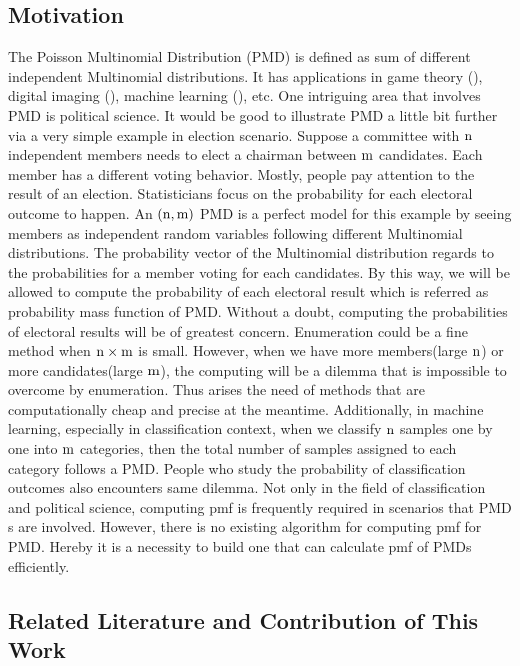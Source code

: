 \documentclass[12pt]{article}
\newcommand{\PMD}{\textrm{PMD}}
\begin{document}
\subsection{Motivation}

The Poisson Multinomial Distribution ($\PMD$) is defined as sum of different independent Multinomial distributions. It has applications in game theory (), digital imaging (), machine learning (), etc. One intriguing area that involves $\PMD$ is political science. It would be good to illustrate $\PMD$ a little bit further via a very simple example in election scenario. Suppose a committee with $\rm n$  independent members needs to elect a chairman between $\rm m$ candidates. Each member has a different voting behavior. Mostly, people pay attention to the result of an election. Statisticians focus on the probability for each electoral outcome to happen. An $\rm (n,m)$ $\PMD$ is a perfect model for this example by seeing members as independent random variables following different Multinomial distributions. The probability vector of the Multinomial distribution regards to the probabilities for a member voting for each candidates. By this way, we will be allowed to compute the probability of each electoral result which is referred as probability mass function of $\PMD$. Without a doubt, computing the probabilities of electoral results will be of greatest concern. Enumeration could be a fine method when $\rm n \times m$ is small. However, when we have more members(large $\rm n$) or more candidates(large $\rm m$), the computing will be a dilemma that is impossible to overcome by enumeration. Thus arises the need of methods that are computationally cheap and precise at the meantime. Additionally, in machine learning, especially in classification context, when we classify $\rm n$ samples one by one into $\rm m$ categories, then the total number of samples assigned to each category follows a $\PMD$. People who study the probability of classification outcomes also encounters same dilemma. Not only in the field of classification and political science, computing pmf is frequently required in scenarios that $\PMD$s are involved. However, there is no existing algorithm for computing pmf for PMD. Hereby it is a necessity to build one that can calculate pmf of $\PMD$s efficiently.



\subsection{Related Literature and Contribution of This Work}
\end{document}
